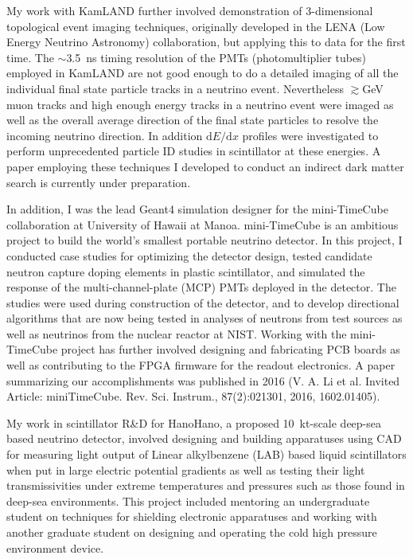 \documentclass[10pt]{article} %
\begin{document}
My work with KamLAND further involved demonstration of 3-dimensional
topological event imaging techniques, originally developed in the LENA (Low
Energy Neutrino Astronomy) collaboration, but applying this to data for the
first time. The $\sim$\SI{3.5}{\nano\second} timing resolution of the PMTs
(photomultiplier tubes) employed in KamLAND are not good enough to do a
detailed imaging of all the individual final state particle tracks in a
neutrino event. Nevertheless $\gtrsim$\si{\giga\electronvolt} muon tracks and
high enough energy tracks in a neutrino event were imaged as well as the
overall average direction of the final state particles to resolve the incoming
neutrino direction. In addition ${\mathrm{d}E}/{\mathrm{d}x}$ profiles were
investigated to perform unprecedented particle ID studies in scintillator at
these energies. A paper employing these techniques I developed to conduct an
indirect dark matter search is currently under preparation.

In addition, I was the lead Geant4 simulation designer for the mini-TimeCube
collaboration at University of Hawaii at Manoa. mini-TimeCube is an ambitious
project to build the world's smallest portable neutrino detector. In this
project, I conducted case studies for optimizing the detector design, tested
candidate neutron capture doping elements in plastic scintillator, and
simulated the response of the multi-channel-plate (MCP) PMTs deployed in the
detector. The studies were used during construction of the detector, and to
develop directional algorithms that are now being tested in analyses of
neutrons from test sources as well as neutrinos from the nuclear reactor at
NIST.
Working with the mini-TimeCube project has further involved designing and
fabricating PCB boards as well as contributing to the FPGA firmware for the
readout electronics. A paper summarizing our accomplishments was published in
2016 (V. A. Li et al. Invited Article: miniTimeCube. Rev. Sci. Instrum.,
87(2):021301, 2016, 1602.01405).

My work in scintillator R\&D for HanoHano, a proposed
\SI{10}{\kilo\tonne}-scale deep-sea based neutrino detector, involved designing
and building apparatuses using CAD for measuring light output of Linear
alkylbenzene (LAB) based liquid scintillators when put in large electric
potential gradients as well as testing their light transmissivities under
extreme temperatures and pressures such as those found in deep-sea
environments. This project included mentoring an undergraduate student on
techniques for shielding electronic apparatuses and working with another
graduate student on designing and operating the cold high pressure environment
device.
\end{document}
